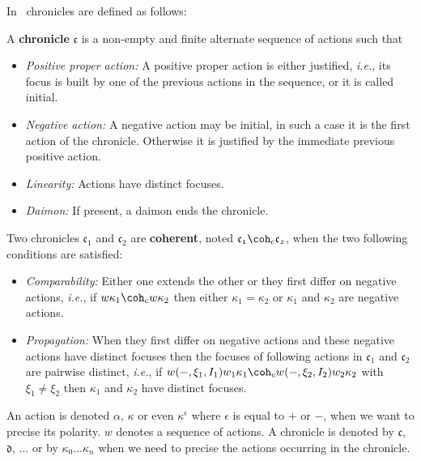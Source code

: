\documentclass{LMCS}
\def\ie{{\em i.e.}}
\newcommand{\chronicle}[1]{{\mathfrak{#1}}}
\begin{document}
In~\cite{DBLP:journals/mscs/Girard01} chronicles are defined as follows:

\begin{defi}[Chronicle]
A {\bf chronicle} $\chronicle{c}$ is a non-empty and finite alternate sequence of actions such that
\begin{itemize}
\item {\em Positive proper action:} A  positive proper action is either justified, \ie, its focus is built by one of the previous actions in the sequence, or it is called initial. 
\item {\em Negative action:} A negative action may be initial, in such a case it is the first action of the chronicle. Otherwise it is justified by the immediate previous positive action.
\item {\em Linearity:} Actions have distinct focuses.
\item {\em Daimon:} If present, a daimon ends the chronicle. 
\end{itemize}
\end{defi}

\begin{defi}
Two chronicles $\chronicle{c_1}$ and $\chronicle{c_2}$ are {\bf coherent}, noted $\chronicle{c_1} \coh_c \chronicle{c_2}$, when the two following conditions are satisfied:
\begin{itemize}
\item {\em Comparability:}  Either one extends the other or they first differ on negative actions, \ie, if $w\kappa_1 \coh_c w\kappa_2$ then either $\kappa_1 = \kappa_2$ or $\kappa_1$ and $\kappa_2$ are negative actions.
\item {\em Propagation:} When they first differ on negative actions and these negative actions have distinct focuses then the focuses of following actions in $\chronicle{c_1}$ and $\chronicle{c_2}$ are pairwise distinct, \ie, if $w(-,\xi_1,I_1)w_1\kappa_1 \coh_c w(-,\xi_2,I_2)w_2\kappa_2$ with $\xi_1 \neq \xi_2$ then $\kappa_1$ and $\kappa_2$ have distinct focuses.
\end{itemize}
\end{defi}

 An action is denoted $\alpha$, $\kappa$ or even $\kappa^{\epsilon}$ where $\epsilon$ is equal to $+$ or $-$, when we want to precise its polarity. $w$ denotes a sequence of actions. A chronicle is denoted by $\chronicle{c}$, $\chronicle{d}$, $\dots$  or by $\kappa_0\dots\kappa_n$ when we need to precise the actions occurring in the chronicle.\\
\end{document}
